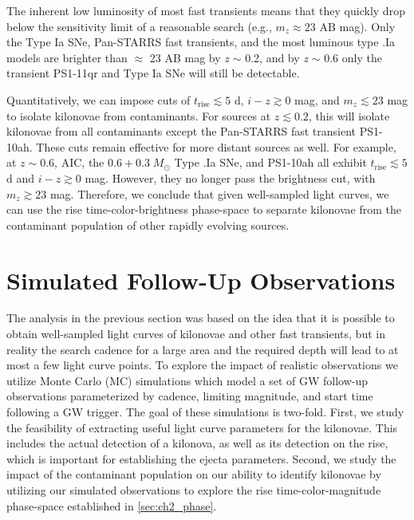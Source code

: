 \clearpage
The inherent low luminosity of most fast transients means that they quickly drop below the sensitivity limit of a reasonable search (e.g., $m_z \approx 23$ AB mag). Only the Type Ia SNe, Pan-STARRS fast transients, and the most luminous type .Ia models are brighter than $\approx$ 23 AB mag by {\em z} $\sim$ 0.2, and by {\em z} $\sim$ 0.6 only the transient PS1-11qr and Type Ia SNe will still be detectable.

Quantitatively, we can impose cuts of $t_{\text{rise}} \lesssim  5$ d, $i-z \gtrsim 0$ mag, and $m_z \lesssim 23$ mag to isolate kilonovae from contaminants. For sources at $z \lesssim 0.2$, this will isolate kilonovae from all contaminants except the Pan-STARRS fast transient PS1-10ah. These cuts remain effective for more distant sources as well. For example, at $z\sim0.6$, AIC, the $0.6+0.3\;M_{\odot}$ Type .Ia SNe, and PS1-10ah all exhibit $t_{\text{rise}} \lesssim  5$ d and $i-z \gtrsim 0$ mag. However, they no longer pass the brightness cut, with $m_z \gtrsim 23$ mag. Therefore, we conclude that given well-sampled light curves, we can use the rise time-color-brightness phase-space to separate kilonovae from the contaminant population of other rapidly evolving sources.

\section{Simulated Follow-Up Observations}
\label{sec:ch2_MCsims}
The analysis in the previous section was based on the idea that it is possible to obtain well-sampled light curves of kilonovae and other fast transients, but in reality the search cadence for a large area and the required depth will lead to at most a few light curve points. To explore the impact of realistic observations we utilize Monte Carlo (MC) simulations which model a set of GW follow-up observations parameterized by cadence, limiting magnitude, and start time following a GW trigger.  The goal of these simulations is two-fold. First, we study the feasibility of extracting useful light curve parameters for the kilonovae. This includes the actual detection of a kilonova, as well as its detection on the rise, which is important for establishing the ejecta parameters. Second, we study the impact of the contaminant population on our ability to identify kilonovae by utilizing our simulated observations to explore the rise time-color-magnitude phase-space established in \cref{sec:ch2_phase}.

